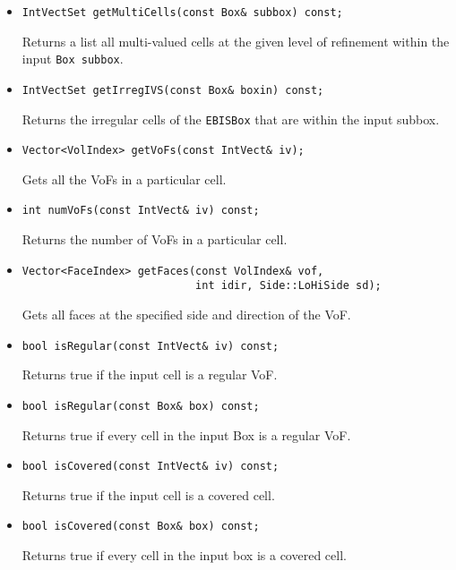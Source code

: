 \begin{itemize}
\item \begin{verbatim}
IntVectSet getMultiCells(const Box& subbox) const;
\end{verbatim}
Returns a list all multi-valued cells at the given level of refinement
within the input {\tt Box subbox}.

\item \begin{verbatim}
IntVectSet getIrregIVS(const Box& boxin) const;
\end{verbatim}
Returns the irregular cells of the {\tt EBISBox} that are 
within the input subbox.

\item \begin{verbatim}
Vector<VolIndex> getVoFs(const IntVect& iv);
\end{verbatim}
Gets all the VoFs in  a particular cell.

\item \begin{verbatim}
int numVoFs(const IntVect& iv) const;
\end{verbatim}
Returns the number of VoFs in a particular cell.

\item \begin{verbatim}
Vector<FaceIndex> getFaces(const VolIndex& vof, 
                           int idir, Side::LoHiSide sd);
\end{verbatim}
Gets all faces at the specified side and direction of the VoF.

\item \begin{verbatim}
bool isRegular(const IntVect& iv) const;
\end{verbatim}
Returns true if the input cell is a regular VoF.

\item \begin{verbatim}
bool isRegular(const Box& box) const;
\end{verbatim}
Returns true if every cell in the input Box is a regular VoF.

\item \begin{verbatim}
bool isCovered(const IntVect& iv) const; 
\end{verbatim}
Returns true if the input cell is a covered cell.

\item \begin{verbatim}
bool isCovered(const Box& box) const; 
\end{verbatim}
Returns true if every cell in the input box is a covered cell.


\end{itemize}
